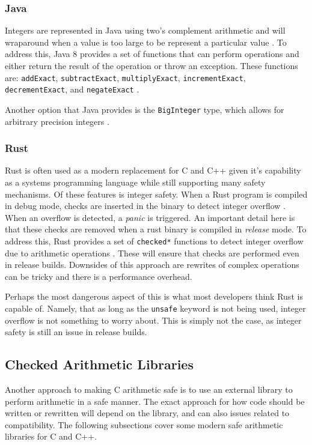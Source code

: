 \subsubsection{Java}

Integers are represented in Java using two's complement arithmetic and will wraparound when a value is too large to be represent a particular value \cite{java_int}. To address this, Java 8 provides a set of functions that can perform operations and either return the result of the operation or throw an exception. These functions are: \texttt{addExact}, \texttt{subtractExact}, \texttt{multiplyExact}, \texttt{incrementExact}, \texttt{decrementExact}, and \texttt{negateExact} \cite{java_exact}.

Another option that Java provides is the \texttt{BigInteger} type, which allows for arbitrary precision integers \cite{bigint}.

\subsubsection{Rust}

Rust is often used as a modern replacement for C and C++ given it's capability as a systems programming language while still supporting many safety mechanisms. Of these features is integer safety. When a Rust program is compiled in debug mode, checks are inserted in the binary to detect integer overflow \cite{rust_book}. When an overflow is detected, a \textit{panic} is triggered. An important detail here is that these checks are removed when a rust binary is compiled in \textit{release} mode. To address this, Rust provides a set of \texttt{checked*} functions to detect integer overflow due to arithmetic operations \cite{rust_checked}. These will ensure that checks are performed even in release builds. Downsides of this approach are rewrites of complex operations can be tricky and there is a performance overhead.

Perhaps the most dangerous aspect of this is what most developers think Rust is capable of. Namely, that as long as the \texttt{unsafe} keyword is not being used, integer overflow is not something to worry about. This is simply not the case, as integer safety is still an issue in release builds.

\subsection{Checked Arithmetic Libraries}

Another approach to making C arithmetic safe is to use an external library to perform arithmetic in a safe manner. The exact approach for how code should be written or rewritten will depend on the library, and can also issues related to compatibility. The following subsections cover some modern safe arithmetic libraries for C and C++.

